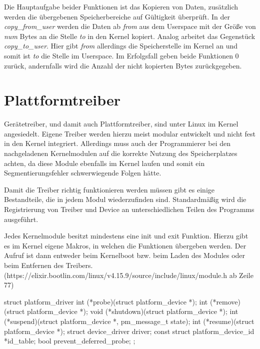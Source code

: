 Die Hauptaufgabe beider Funktionen ist das Kopieren von Daten, zusätzlich werden die übergebenen Speicherbereiche auf Gültigkeit überprüft. 
In der \textit{copy\_from\_user} werden die Daten ab \textit{from} aus dem Userspace mit der Größe von \textit{num} Bytes an die Stelle \textit{to} in den Kernel kopiert.
Analog arbeitet das Gegenstück \textit{copy\_to\_user}. Hier gibt \textit{from} allerdings die Speicherstelle im Kernel an und somit ist \textit{to} die Stelle im Userspace.
Im Erfolgsfall geben beide Funktionen 0 zurück, andernfalls wird die Anzahl der nicht kopierten Bytes zurückgegeben. \citep[S. 250f]{schroder2009embedded}

\section{Plattformtreiber}\label{sec:plat_t}
Gerätetreiber, und damit auch Plattformtreiber, sind unter Linux im Kernel angesiedelt. Eigene Treiber werden hierzu meist modular entwickelt und nicht fest in den Kernel integriert. Allerdings muss auch der Programmierer bei den nachgeladenen Kernelmodulen auf die korrekte Nutzung des Speicherplatzes achten, da diese Module ebenfalls im Kernel laufen und somit ein Segmentierungsfehler schwerwiegende Folgen hätte. \citep[S. 231ff.]{schroder2009embedded}

Damit die Treiber richtig funktionieren werden müssen gibt es einige Bestandteile, die in jedem Modul wiederzufinden sind. Standardmäßig wird die Registrierung von Treiber und Device an unterschiedlichen Teilen des Programms ausgeführt. \cite{corbetplatform} 

Jedes Kernelmodule besitzt mindestens eine init und exit Funktion. Hierzu gibt es im Kernel eigene Makros, in welchen die Funktionen übergeben werden. Der Aufruf ist dann entweder beim Kernelboot bzw. beim Laden des Modules oder beim Entfernen des Treibers.
(https://elixir.bootlin.com/linux/v4.15.9/source/include/linux/module.h ab Zeile 77)

\begin{minipage}{\textwidth}
	\begin{bash}
struct platform_driver {
	int (*probe)(struct platform_device *);
	int (*remove)(struct platform_device *);
	void (*shutdown)(struct platform_device *);
	int (*suspend)(struct platform_device *, pm_message_t state);
	int (*resume)(struct platform_device *);
	struct device_driver driver;
	const struct platform_device_id *id_table;
	bool prevent_deferred_probe;
};
	\end{bash}
\end{minipage}

